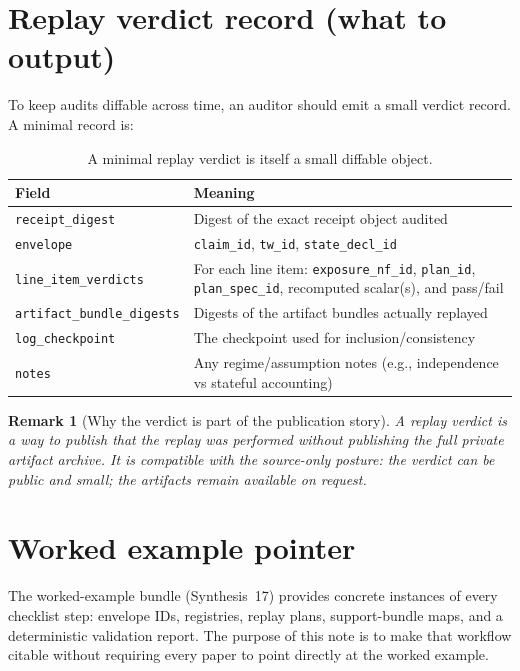 \documentclass[11pt]{article}
\newtheorem{remark}{Remark}
\begin{document}
\section{Replay verdict record (what to output)}\label{sec:verdict}
To keep audits diffable across time, an auditor should emit a small verdict record.
A minimal record is:
\begin{table}[t]
\centering\small
\begin{tabularx}{\linewidth}{@{}lX@{}}
\toprule
Field & Meaning \\
\midrule
\texttt{receipt\_digest} & Digest of the exact receipt object audited \\
\texttt{envelope} & \texttt{claim\_id}, \texttt{tw\_id}, \texttt{state\_decl\_id} \\
\texttt{line\_item\_verdicts} & For each line item: \texttt{exposure\_nf\_id}, \texttt{plan\_id}, \texttt{plan\_spec\_id}, recomputed scalar(s), and pass/fail \\
\texttt{artifact\_bundle\_digests} & Digests of the artifact bundles actually replayed \\
\texttt{log\_checkpoint} & The checkpoint used for inclusion/consistency \\
\texttt{notes} & Any regime/assumption notes (e.g., independence vs stateful accounting) \\
\bottomrule
\end{tabularx}
\caption{A minimal replay verdict is itself a small diffable object.}
\end{table}

\begin{remark}[Why the verdict is part of the publication story]
A replay verdict is a way to publish \emph{that the replay was performed} without publishing the full private artifact archive.
It is compatible with the source-only posture: the verdict can be public and small; the artifacts remain available on request.
\end{remark}

\section{Worked example pointer}
The worked-example bundle (Synthesis~17) provides concrete instances of every checklist step: envelope IDs, registries, replay plans, support-bundle maps, and a deterministic validation report.\cite{series:workedexample}
The purpose of this note is to make that workflow citable without requiring every paper to point directly at the worked example.
\end{document}
